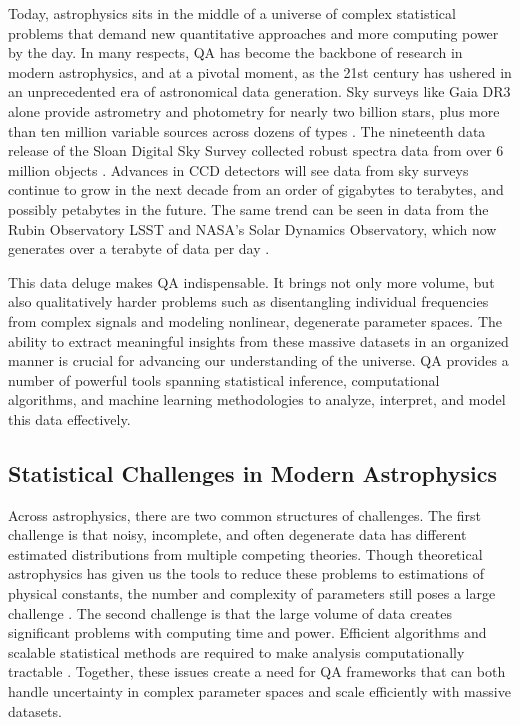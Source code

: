 \documentclass[preprint2,linenumbers,longauthor]{aastex631}
\begin{document}
Today, astrophysics sits in the middle of a universe of complex statistical problems that demand new quantitative approaches and more computing power by the day. In many respects, QA has become the backbone of research in modern astrophysics, and at a pivotal moment, as the 21st century has ushered in an unprecedented era of astronomical data generation. Sky surveys like Gaia DR3 alone provide astrometry and photometry for nearly two billion stars, plus more than ten million variable sources across dozens of types \citep{gaiacollaborationGaiaDataRelease2023}. The nineteenth data release of the Sloan Digital Sky Survey collected robust spectra data from over 6 million objects \citep{collaborationNineteenthDataRelease2025}. Advances in CCD detectors will see data from sky surveys continue to grow in the next decade from an order of gigabytes to terabytes, and possibly petabytes in the future. The same trend can be seen in data from the Rubin Observatory LSST and NASA's Solar Dynamics Observatory, which now generates over a terabyte of data per day \citep{borneAstroinformatics21stCentury2009}.

This data deluge makes QA indispensable. It brings not only more volume, but also qualitatively harder problems such as disentangling individual frequencies from complex signals and modeling nonlinear, degenerate parameter spaces. The ability to extract meaningful insights from these massive datasets in an organized manner is crucial for advancing our understanding of the universe. QA provides a number of powerful tools spanning statistical inference, computational algorithms, and machine learning methodologies to analyze, interpret, and model this data effectively.

\subsection{Statistical Challenges in Modern Astrophysics}

Across astrophysics, there are two common structures of challenges. The first challenge is that noisy, incomplete, and often degenerate data has different estimated distributions from multiple competing theories. Though theoretical astrophysics has given us the tools to reduce these problems to estimations of physical constants, the number and complexity of parameters still poses a large challenge \citep{schaferFrameworkStatisticalInference2015}. The second challenge is that the large volume of data creates significant problems with computing time and power. Efficient algorithms and scalable statistical methods are required to make analysis computationally tractable \citep{huijseComputationalIntelligenceChallenges2014}. Together, these issues create a need for QA frameworks that can both handle uncertainty in complex parameter spaces and scale efficiently with massive datasets.
\end{document}

